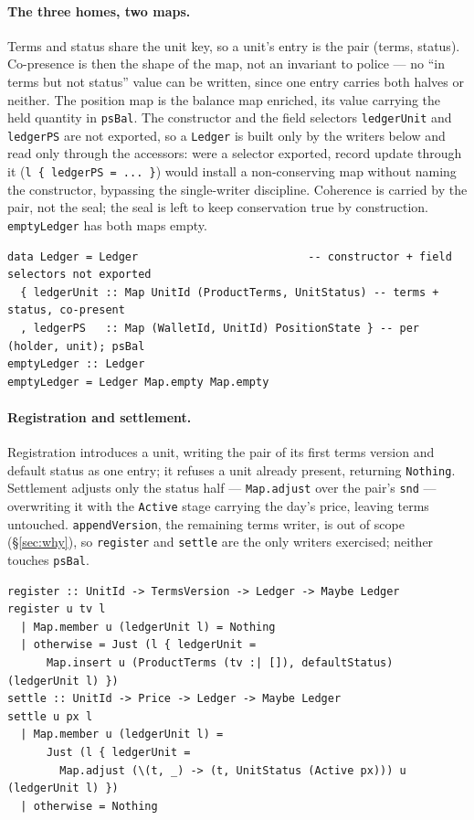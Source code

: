 \documentclass[11pt,a4paper]{article}
\begin{document}
\paragraph{The three homes, two maps.}
Terms and status share the unit key, so a unit's
entry is the pair (terms, status). Co-presence is then the shape of the map, not an
invariant to police --- no ``in terms but not status'' value can be written, since
one entry carries both halves or neither. The position map is the balance map
enriched, its value carrying the held quantity in \texttt{psBal}. The constructor and
the field selectors \texttt{ledgerUnit} and \texttt{ledgerPS} are not exported, so a
\texttt{Ledger} is built only by the writers below and read only through the accessors:
were a selector exported, record update through it (\texttt{l \{ ledgerPS = ... \}})
would install a non-conserving map without naming the constructor, bypassing the
single-writer discipline. Coherence is carried by the pair, not the seal; the seal is
left to keep conservation true by construction. \texttt{emptyLedger} has both maps empty.

\begin{lstlisting}
data Ledger = Ledger                          -- constructor + field selectors not exported
  { ledgerUnit :: Map UnitId (ProductTerms, UnitStatus) -- terms + status, co-present
  , ledgerPS   :: Map (WalletId, UnitId) PositionState } -- per (holder, unit); psBal
emptyLedger :: Ledger
emptyLedger = Ledger Map.empty Map.empty
\end{lstlisting}

\paragraph{Registration and settlement.}
Registration introduces a unit, writing the pair of its first terms version and
default status as one entry; it refuses a unit already present, returning
\texttt{Nothing}.
Settlement adjusts only the status half --- \texttt{Map.adjust} over the pair's
\texttt{snd} --- overwriting it with the \texttt{Active} stage carrying the day's
price, leaving terms untouched. \texttt{appendVersion}, the remaining terms writer, is
out of scope (\S\ref{sec:why}), so \texttt{register} and \texttt{settle} are the only
writers exercised; neither touches \texttt{psBal}.

\begin{lstlisting}
register :: UnitId -> TermsVersion -> Ledger -> Maybe Ledger
register u tv l
  | Map.member u (ledgerUnit l) = Nothing
  | otherwise = Just (l { ledgerUnit =
      Map.insert u (ProductTerms (tv :| []), defaultStatus) (ledgerUnit l) })
settle :: UnitId -> Price -> Ledger -> Maybe Ledger
settle u px l
  | Map.member u (ledgerUnit l) =
      Just (l { ledgerUnit =
        Map.adjust (\(t, _) -> (t, UnitStatus (Active px))) u (ledgerUnit l) })
  | otherwise = Nothing
\end{lstlisting}
\end{document}
